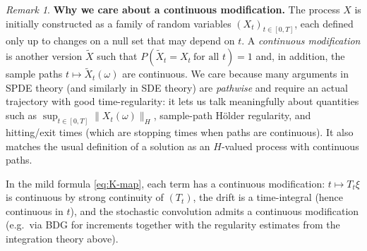\documentclass[11pt]{article}
\theoremstyle{definition}
\theoremstyle{remark}
\newtheorem{remark}{Remark}
\begin{document}
\begin{remark}
\textbf{Why we care about a continuous modification.}
The process $X$ is initially constructed as a family of random variables $(X_t)_{t\in[0,T]}$,
each defined only up to changes on a null set that may depend on $t$.
A \emph{continuous modification} is another version $\widetilde X$ such that
$P(\widetilde X_t=X_t\ \text{for all }t)=1$ and, in addition, the sample paths
$t\mapsto \widetilde X_t(\omega)$ are continuous.
We care because many arguments in SPDE theory (and similarly in SDE theory) are \emph{pathwise} and require an actual trajectory
with good time-regularity: it lets us talk meaningfully about quantities such as
$\sup_{t\in[0,T]}\|X_t(\omega)\|_H$, sample-path H\"older regularity, and hitting/exit times
(which are stopping times when paths are continuous).
It also matches the usual definition of a solution as an $H$-valued process with continuous paths.

In the mild formula \eqref{eq:K-map}, each term has a continuous modification:
$t\mapsto T_t\xi$ is continuous by strong continuity of $(T_t)$,
the drift is a time-integral (hence continuous in $t$),
and the stochastic convolution admits a continuous modification (e.g.\ via BDG for increments together
with the regularity estimates from the integration theory above).
\end{remark}
\end{document}
